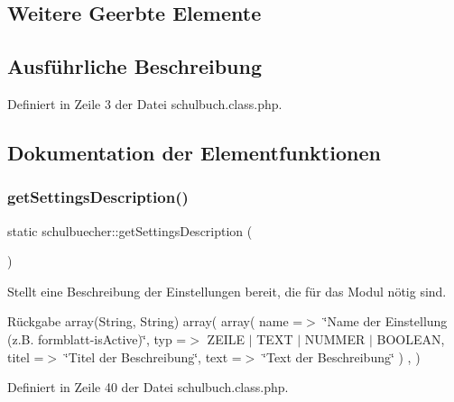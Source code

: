 \subsection*{Weitere Geerbte Elemente}


\subsection{Ausführliche Beschreibung}


Definiert in Zeile 3 der Datei schulbuch.\+class.\+php.



\subsection{Dokumentation der Elementfunktionen}
\mbox{\label{classschulbuecher_a12bf8c79ff6d2b1fe8bf6eb845f87e2d}} 
\subsubsection{\texorpdfstring{get\+Settings\+Description()}{getSettingsDescription()}\hspace{0.1cm}{\footnotesize\ttfamily [1/2]}}
{\footnotesize\ttfamily static schulbuecher\+::get\+Settings\+Description (\begin{DoxyParamCaption}{ }\end{DoxyParamCaption})\hspace{0.3cm}{\ttfamily [static]}}

Stellt eine Beschreibung der Einstellungen bereit, die für das Modul nötig sind. \begin{DoxyReturn}{Rückgabe}
array(\+String, String) array( array( \textquotesingle{}name\textquotesingle{} =$>$ \char`\"{}\+Name der Einstellung (z.\+B. formblatt-\/is\+Active)\char`\"{}, \textquotesingle{}typ\textquotesingle{} =$>$ Z\+E\+I\+LE $\vert$ T\+E\+XT $\vert$ N\+U\+M\+M\+ER $\vert$ B\+O\+O\+L\+E\+AN, \textquotesingle{}titel\textquotesingle{} =$>$ \char`\"{}\+Titel der Beschreibung\char`\"{}, \textquotesingle{}text\textquotesingle{} =$>$ \char`\"{}\+Text der Beschreibung\char`\"{} ) , ) 
\end{DoxyReturn}


Definiert in Zeile 40 der Datei schulbuch.\+class.\+php.

